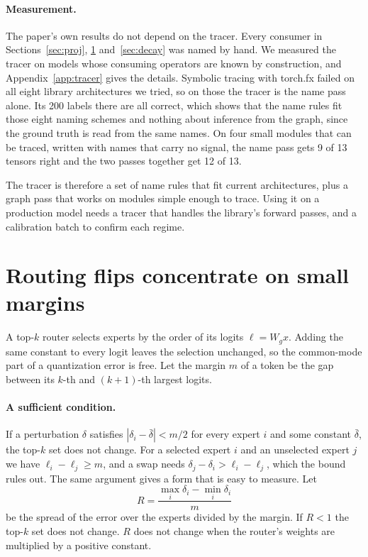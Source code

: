\documentclass[10pt]{article}
\begin{document}
\paragraph{Measurement.} The paper's own results do not depend on the tracer. Every consumer in
Sections~\ref{sec:proj}, \ref{sec:route} and~\ref{sec:decay} was named by hand. We measured the
tracer on models whose consuming operators are known by construction, and
Appendix~\ref{app:tracer} gives the details. Symbolic tracing with torch.fx failed on all eight
library architectures we tried, so on those the tracer is the name pass alone. Its 200 labels
there are all correct, which shows that the name rules fit those eight naming schemes and nothing
about inference from the graph, since the ground truth is read from the same names. On four small
modules that can be traced, written with names that carry no signal, the name pass gets 9 of 13
tensors right and the two passes together get 12 of 13.

The tracer is therefore a set of name rules that fit current architectures, plus a graph pass
that works on modules simple enough to trace. Using it on a production model needs a tracer that
handles the library's forward passes, and a calibration batch to confirm each regime.

\section{Routing flips concentrate on small margins}\label{sec:route}

A top-$k$ router selects experts by the order of its logits $\ell = W_g x$. Adding the same
constant to every logit leaves the selection unchanged, so the common-mode part of a
quantization error is free. Let the margin $m$ of a token be the gap between its $k$-th and
$(k{+}1)$-th largest logits.

\paragraph{A sufficient condition.} If a perturbation $\delta$ satisfies
$|\delta_i - \bar\delta| < m/2$ for every expert $i$ and some constant $\bar\delta$, the top-$k$
set does not change. For a selected expert $i$ and an unselected expert $j$ we have
$\ell_i - \ell_j \geq m$, and a swap needs $\delta_j - \delta_i > \ell_i - \ell_j$, which the
bound rules out. The same argument gives a form that is easy to measure. Let
\begin{equation}
R = \frac{\max_i \delta_i - \min_i \delta_i}{m}
\end{equation}
be the spread of the error over the experts divided by the margin. If $R < 1$ the top-$k$ set
does not change. $R$ does not change when the router's weights are multiplied by a positive
constant.
\end{document}
